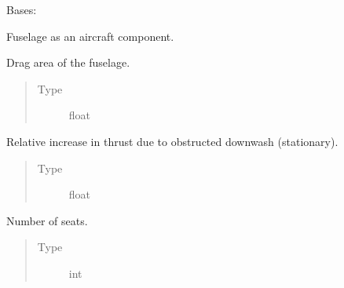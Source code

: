 \documentclass[letterpaper,10pt,english]{sphinxmanual}
\begin{document}
\begin{fulllineitems}
\label{\detokenize{modules/fuselage:fuselage.Fuselage}}
\sphinxAtStartPar
Bases: 

\sphinxAtStartPar
Fuselage as an aircraft component.

\begin{fulllineitems}
\label{\detokenize{modules/fuselage:fuselage.Fuselage.drag_area}}
\sphinxAtStartPar
Drag area of the fuselage.
\begin{quote}\begin{description}
\item[{Type}] \leavevmode
\sphinxAtStartPar
float

\end{description}\end{quote}

\end{fulllineitems}


\begin{fulllineitems}
\label{\detokenize{modules/fuselage:fuselage.Fuselage.download_stationary}}
\sphinxAtStartPar
Relative increase in thrust due to obstructed downwash (stationary).
\begin{quote}\begin{description}
\item[{Type}] \leavevmode
\sphinxAtStartPar
float

\end{description}\end{quote}

\end{fulllineitems}


\begin{fulllineitems}
\label{\detokenize{modules/fuselage:fuselage.Fuselage.number_of_seats}}
\sphinxAtStartPar
Number of seats.
\begin{quote}\begin{description}
\item[{Type}] \leavevmode
\sphinxAtStartPar
int


\end{description}
\end{quote}
\end{fulllineitems}
\end{fulllineitems}
\end{document}
